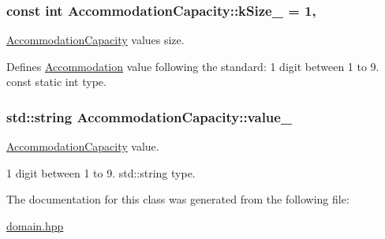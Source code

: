 \subsubsection[{\texorpdfstring{k\+Size\+\_\+}{kSize_}}]{\setlength{\rightskip}{0pt plus 5cm}const int Accommodation\+Capacity\+::k\+Size\+\_\+ = 1\hspace{0.3cm}{\ttfamily [static]}, {\ttfamily [private]}}\hypertarget{classAccommodationCapacity_a147b7ab2a9fc7907e1eafd959b51d5c6}{}\label{classAccommodationCapacity_a147b7ab2a9fc7907e1eafd959b51d5c6}


\hyperlink{classAccommodationCapacity}{Accommodation\+Capacity} value\textquotesingle{}s size. 

Defines \hyperlink{classAccommodation}{Accommodation} value following the standard\+: 1 digit between 1 to 9. const static int type. 
\subsubsection[{\texorpdfstring{value\+\_\+}{value_}}]{\setlength{\rightskip}{0pt plus 5cm}std\+::string Accommodation\+Capacity\+::value\+\_\+\hspace{0.3cm}{\ttfamily [private]}}\hypertarget{classAccommodationCapacity_a2e811f61cc0f5d813defdf1063e12c55}{}\label{classAccommodationCapacity_a2e811f61cc0f5d813defdf1063e12c55}


\hyperlink{classAccommodationCapacity}{Accommodation\+Capacity} value. 

1 digit between 1 to 9. std\+::string type. 

The documentation for this class was generated from the following file\+:\begin{DoxyCompactItemize}
\item 
\hyperlink{domain_8hpp}{domain.\+hpp}\end{DoxyCompactItemize}

